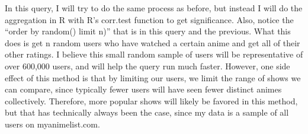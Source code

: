 \documentclass[
]{article}
\begin{document}
In this query, I will try to do the same process as before, but instead
I will do the aggregation in R with R's corr.test function to get
significance. Also, notice the ``order by random() limit n)'' that is in
this query and the previous. What this does is get n random users who
have watched a certain anime and get all of their other ratings. I
believe this small random sample of users will be representative of over
600,000 users, and will help the query run much faster. However, one
side effect of this method is that by limiting our users, we limit the
range of shows we can compare, since typically fewer users will have
seen fewer distinct animes collectively. Therefore, more popular shows
will likely be favored in this method, but that has technically always
been the case, since my data is a sample of all users on
myanimelist.com.
\end{document}
